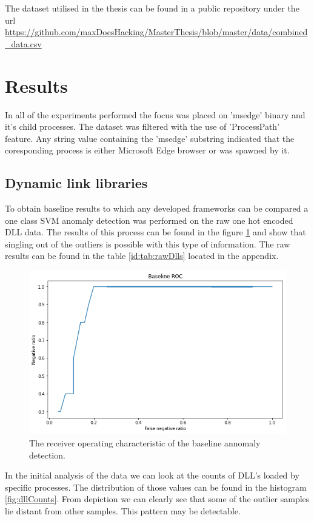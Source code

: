 \documentclass[a4paper,twoside,12pt]{book}
\begin{document}
The dataset utilised in the thesis can be found in a public repository under the url 
\url{https://github.com/maxDoesHacking/MasterThesis/blob/master/data/combined_data.csv}


\section{Results}

In all of the experiments performed the focus was placed on 'msedge' binary and it's child processes.
The dataset was filtered with the use of 'ProcessPath' feature. Any string value containing the 'msedge'
substring indicated that the coresponding process is either Microsoft Edge browser or was spawned by it. 

\subsection{Dynamic link libraries}
To obtain baseline results to which any developed frameworks can be compared a one class SVM anomaly 
detection was performed on the raw one hot encoded DLL data. The results of this process can be found
in the figure \ref{fig:DLLBaselineROC} and show that singling out of the outliers is possible with this type 
of information. The raw results can be found in the table \ref{id:tab:rawDlls} located in the appendix. 

\begin{figure}
	\centering
	\includegraphics{images/DLLBaselineROCKF}
	\caption{The receiver operating characteristic of the baseline annomaly detection.}
	\label{fig:DLLBaselineROC}
 \end{figure}
	
In the initial analysis of the data we can look at the counts of DLL's loaded by specific 
processes. The distribution of those values can be found in the histogram \ref{fig:dllCounts}. 
From depiction we can clearly see that some of the outlier samples lie distant from other 
samples. This pattern may be detectable. 
\end{document}
